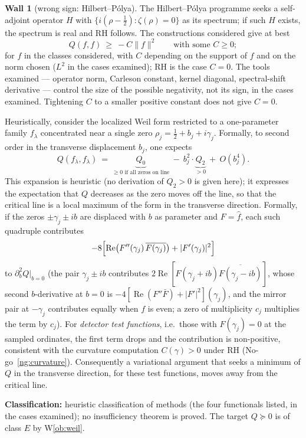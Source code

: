 \documentclass[11pt]{amsart}
\theoremstyle{definition}
\theoremstyle{remark}
\theoremstyle{definition}
\newtheorem{obstruction}{Wall}[section]
\renewcommand{\Re}{\operatorname{Re}}
\begin{document}
\begin{obstruction}[wrong sign: Hilbert--P\'olya]\label{ob:wrongsign}
The Hilbert--P\'olya programme seeks a self-adjoint operator $H$ with $\{i(\rho-\tfrac12):\zeta(\rho)=0\}$
as its spectrum; if such $H$ exists, the spectrum is real and RH follows. The constructions considered give at best
\[
   Q(f,f)\ \ge\ -C\|f\|^2\qquad\text{with some }C\ge0;
\]
for $f$ in the classes considered, with $C$ depending on the support of $f$ and on the norm
chosen ($L^2$ in the cases examined); RH is the case $C=0$. The tools examined --- operator norm, Carleson constant, kernel diagonal,
spectral-shift derivative --- control the size of the possible negativity, not its sign, in the cases
examined. Tightening $C$ to a smaller positive constant does not give $C=0$.

Heuristically, consider the localized Weil form restricted to a one-parameter family $f_\lambda$
concentrated near a single zero $\rho_j=\tfrac12+b_j+i\gamma_j$. Formally, to second order in the transverse
displacement $b_j$, one expects
\[
   Q(f_\lambda,f_\lambda)\ =\ \underbrace{Q_0}_{\ge0\text{ if all zeros on line}}
   \ -\ b_j^2\cdot\underbrace{Q_2}_{>0}\ +\ O(b_j^4).
\]
This expansion is heuristic (no derivation of $Q_2>0$ is given here); it expresses the expectation that $Q$
decreases as the zero moves off the line, so that the critical line is a local maximum of the form in the
transverse direction. Formally, if the zeros $\pm\gamma_j\pm ib$ are displaced with $b$ as parameter and
$F=\widehat f$, each such quadruple contributes
\[
   -8\Bigl[\Re\bigl(F''(\gamma_j)\,\overline{F(\gamma_j)}\bigr)+|F'(\gamma_j)|^2\Bigr]
\]
to $\partial_b^2Q|_{b=0}$ (the pair $\gamma_j\pm ib$ contributes $2\Re[F(\gamma_j+ib)\overline{F(\gamma_j-ib)}]$,
whose second $b$-derivative at $b=0$ is $-4[\Re(F''\bar F)+|F'|^2](\gamma_j)$, and the mirror pair at
$-\gamma_j$ contributes equally when $f$ is even; a zero of multiplicity $c_j$ multiplies the term by $c_j$).
For \emph{detector test functions}, i.e.\ those with $F(\gamma_j)=0$ at the sampled ordinates, the first
term drops and the contribution is non-positive, consistent with the curvature computation
$C(\gamma)>0$ under RH (No-go~\ref{ng:curvature}). Consequently a variational argument that seeks a
minimum of $Q$ in the transverse direction, for these test functions, moves away from the critical line.

\smallskip\noindent\textbf{Classification:} heuristic classification of methods (the four functionals
listed, in the cases examined); no insufficiency theorem is proved. The target $Q\succeq0$ is of class
$E$ by W\ref{ob:weil}.
\end{obstruction}
\end{document}
